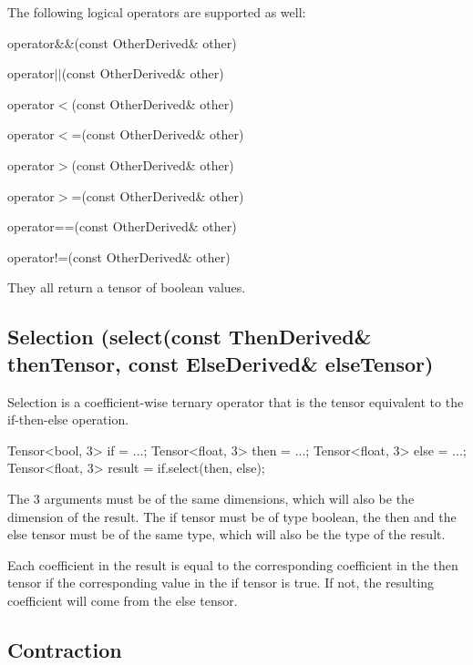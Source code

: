 The following logical operators are supported as well\+:


\begin{DoxyItemize}
\item operator\&\&(const Other\+Derived\& other)
\item operator$\vert$$\vert$(const Other\+Derived\& other)
\item operator$<$(const Other\+Derived\& other)
\item operator$<$=(const Other\+Derived\& other)
\item operator$>$(const Other\+Derived\& other)
\item operator$>$=(const Other\+Derived\& other)
\item operator==(const Other\+Derived\& other)
\item operator!=(const Other\+Derived\& other)
\end{DoxyItemize}

They all return a tensor of boolean values.

\subsection*{Selection (select(const Then\+Derived\& then\+Tensor, const Else\+Derived\& else\+Tensor)}

Selection is a coefficient-\/wise ternary operator that is the tensor equivalent to the if-\/then-\/else operation. \begin{DoxyVerb}Tensor<bool, 3> if = ...;
Tensor<float, 3> then = ...;
Tensor<float, 3> else = ...;
Tensor<float, 3> result = if.select(then, else);
\end{DoxyVerb}


The 3 arguments must be of the same dimensions, which will also be the dimension of the result. The \textquotesingle{}if\textquotesingle{} tensor must be of type boolean, the \textquotesingle{}then\textquotesingle{} and the \textquotesingle{}else\textquotesingle{} tensor must be of the same type, which will also be the type of the result.

Each coefficient in the result is equal to the corresponding coefficient in the \textquotesingle{}then\textquotesingle{} tensor if the corresponding value in the \textquotesingle{}if\textquotesingle{} tensor is true. If not, the resulting coefficient will come from the \textquotesingle{}else\textquotesingle{} tensor.

\subsection*{Contraction}

